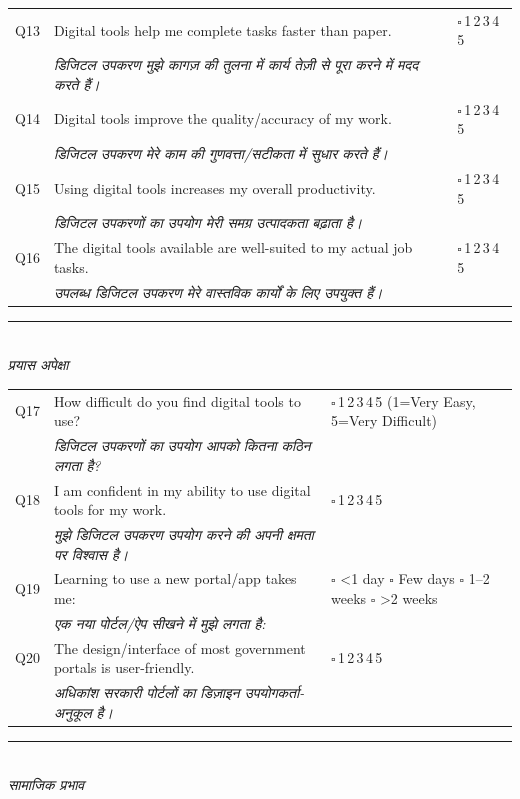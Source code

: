 \documentclass[10pt,a4paper]{article}
\newcommand{\likert}{{\Large$\square$}\,1\quad{\Large$\square$}\,2\quad{\Large$\square$}\,3\quad{\Large$\square$}\,4\quad{\Large$\square$}\,5}
\begin{document}
\noindent\begin{tabularx}{\textwidth}{@{}L{0.8cm} X L{5.2cm}@{}}
Q13 & Digital tools help me complete tasks faster than paper. & \likert \\
 & {\hindifont\small\itshape\color{black!70} डिजिटल उपकरण मुझे कागज़ की तुलना में कार्य तेज़ी से पूरा करने में मदद करते हैं।} & \\[3pt]
Q14 & Digital tools improve the quality/accuracy of my work. & \likert \\
 & {\hindifont\small\itshape\color{black!70} डिजिटल उपकरण मेरे काम की गुणवत्ता/सटीकता में सुधार करते हैं।} & \\[3pt]
Q15 & Using digital tools increases my overall productivity. & \likert \\
 & {\hindifont\small\itshape\color{black!70} डिजिटल उपकरणों का उपयोग मेरी समग्र उत्पादकता बढ़ाता है।} & \\[3pt]
Q16 & The digital tools available are well-suited to my actual job tasks. & \likert \\
 & {\hindifont\small\itshape\color{black!70} उपलब्ध डिजिटल उपकरण मेरे वास्तविक कार्यों के लिए उपयुक्त हैं।} & \\[3pt]
\end{tabularx}
\vspace{4pt}
\noindent\rule{\textwidth}{0.3pt}\vspace{3pt}
\\
{\hindifont\itshape\color{black!70} प्रयास अपेक्षा}\vspace{3pt}

\noindent\begin{tabularx}{\textwidth}{@{}L{0.8cm} X L{5.2cm}@{}}
Q17 & How difficult do you find digital tools to use? & \likert{} {\scriptsize(1=Very Easy, 5=Very Difficult)} \\
 & {\hindifont\small\itshape\color{black!70} डिजिटल उपकरणों का उपयोग आपको कितना कठिन लगता है?} & \\[3pt]
Q18 & I am confident in my ability to use digital tools for my work. & \likert \\
 & {\hindifont\small\itshape\color{black!70} मुझे डिजिटल उपकरण उपयोग करने की अपनी क्षमता पर विश्वास है।} & \\[3pt]
Q19 & Learning to use a new portal/app takes me: & {\Large$\square$} <1 day {\Large$\square$} Few days {\Large$\square$} 1--2 weeks {\Large$\square$} >2 weeks \\
 & {\hindifont\small\itshape\color{black!70} एक नया पोर्टल/ऐप सीखने में मुझे लगता है:} & \\[3pt]
Q20 & The design/interface of most government portals is user-friendly. & \likert \\
 & {\hindifont\small\itshape\color{black!70} अधिकांश सरकारी पोर्टलों का डिज़ाइन उपयोगकर्ता-अनुकूल है।} & \\[3pt]
\end{tabularx}
\vspace{4pt}
\noindent\rule{\textwidth}{0.3pt}\vspace{3pt}
\\
{\hindifont\itshape\color{black!70} सामाजिक प्रभाव}\vspace{3pt}
\end{document}
